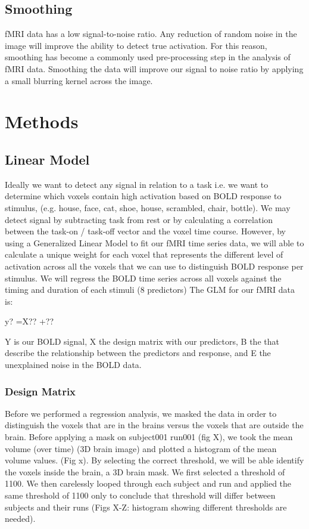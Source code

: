 \documentclass[12pt]{article}
\begin{document}
\subsection{Smoothing}

fMRI data has a low signal-to-noise ratio. Any reduction of random noise in the 
image will improve the ability to detect true activation.  For this reason, 
smoothing has become a commonly used pre-processing step in the analysis of fMRI 
data. Smoothing the data will improve our signal to noise ratio by applying a 
small blurring kernel across the image.

\section{Methods}

\subsection{Linear Model}
Ideally we want to detect any signal in relation to a task i.e. we want to 
determine which voxels contain high activation based on BOLD response to 
stimulus, (e.g. house, face, cat, shoe, house, scrambled, chair, bottle). We 
may detect signal by subtracting task from rest or by calculating a correlation 
between the task-on / task-off vector and the voxel time course. However, by 
using a Generalized Linear Model to fit our fMRI time series data, we will able 
to calculate a unique weight for each voxel that represents the different level 
of activation across all the voxels that we can use to distinguish BOLD 
response per stimulus.  We will regress the BOLD time series across all voxels 
against the timing and duration of each stimuli (8 predictors) The GLM for our 
fMRI data is:

y? =X?? +??

Y is our BOLD signal, X the design matrix with our predictors, B the that 
describe the relationship between the predictors and response, and E the 
unexplained noise in the BOLD data.

\subsubsection{Design Matrix}
Before we performed a regression analysis, we masked the data in order to 
distinguish the voxels that are in the brains versus the voxels that are 
outside the brain. Before applying a mask on subject001 run001 (fig X), we took 
the mean volume (over time) (3D brain image) and plotted a histogram of the 
mean volume values. (Fig x). By selecting the correct threshold, we will be 
able identify the voxels inside the brain, a 3D brain mask. We first selected a 
threshold of 1100. We then carelessly looped through each subject and run and 
applied the same threshold of 1100 only to conclude that threshold will differ 
between subjects and their runs (Figs X-Z: histogram showing different 
thresholds are needed). 
\end{document}
